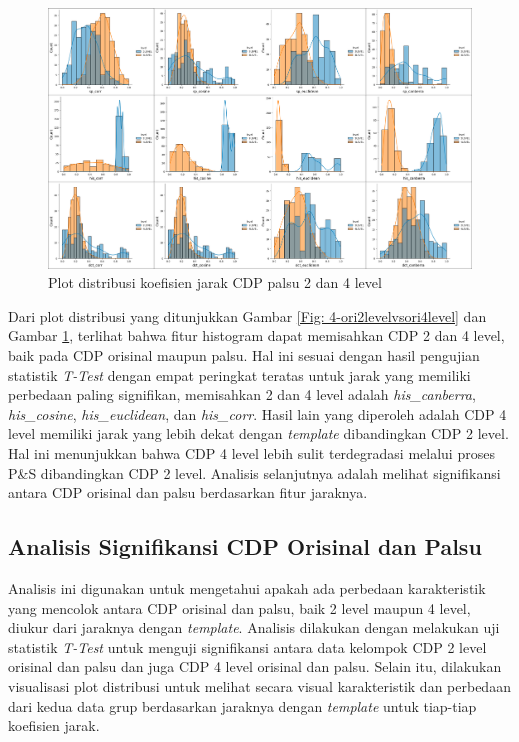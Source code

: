 \begin{figure}[!h]
	\centering
	\includegraphics[width=\textwidth]{contents/chapter-4/4-fake2levelvsfake4level.png}
	\caption{Plot distribusi koefisien jarak CDP palsu 2 dan 4 level}
	\label{Fig: 4-fake2levelvsfake4level}
\end{figure}

Dari plot distribusi yang ditunjukkan Gambar \ref{Fig: 4-ori2levelvsori4level} dan Gambar \ref{Fig: 4-fake2levelvsfake4level}, terlihat bahwa fitur histogram
dapat memisahkan CDP 2 dan 4 level, baik pada CDP orisinal maupun palsu. Hal ini sesuai dengan hasil pengujian statistik \emph{T-Test} dengan empat peringkat
teratas untuk jarak yang memiliki perbedaan paling signifikan, memisahkan 2 dan 4 level adalah \emph{his\_canberra}, \emph{his\_cosine}, \emph{his\_euclidean},
dan \emph{his\_corr}. Hasil lain yang diperoleh adalah CDP 4 level memiliki jarak yang lebih dekat dengan \emph{template} dibandingkan CDP 2 level. Hal ini
menunjukkan bahwa CDP 4 level lebih sulit terdegradasi melalui proses P\&S dibandingkan CDP 2 level. Analisis selanjutnya adalah melihat signifikansi antara
CDP orisinal dan palsu berdasarkan fitur jaraknya.

\subsection{Analisis Signifikansi CDP Orisinal dan Palsu}
Analisis ini digunakan untuk mengetahui apakah ada perbedaan karakteristik yang mencolok antara CDP orisinal dan palsu, baik 2 level maupun 4 level, diukur
dari jaraknya dengan \emph{template}. Analisis dilakukan dengan melakukan uji statistik \emph{T-Test} untuk menguji signifikansi antara data kelompok CDP 2
level orisinal dan palsu dan juga CDP 4 level orisinal dan palsu. Selain itu, dilakukan visualisasi plot distribusi untuk melihat secara visual karakteristik
dan perbedaan dari kedua data grup berdasarkan jaraknya dengan \emph{template} untuk tiap-tiap koefisien jarak.

